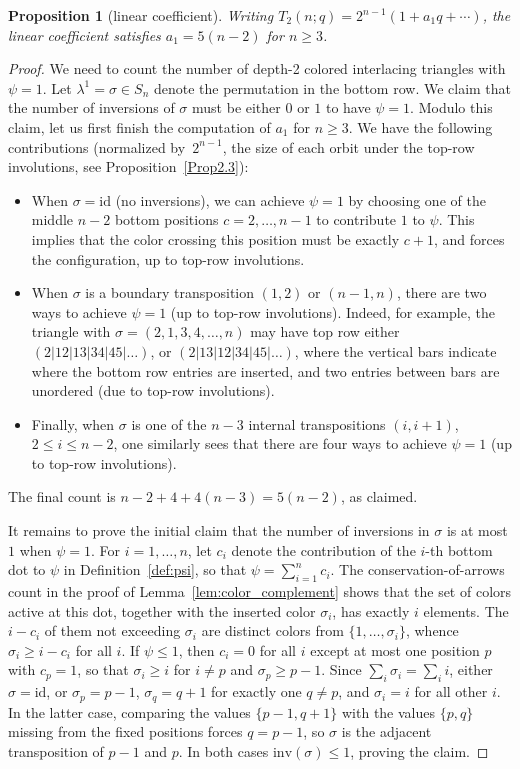 \documentclass[10pt,a4paper]{amsart}
\numberwithin{equation}{section}
\newtheorem{Proposition}[Theorem]{Proposition}
\theoremstyle{definition}
\begin{document}
\begin{Proposition}[linear coefficient]\label{prop:linear_coefficient} Writing
	$T_2(n;q) = 2^{n-1}(1 + a_1 q + \cdots)$, the linear coefficient satisfies
	$a_1 = 5(n-2)$ for $n \ge 3$.
\end{Proposition}
\begin{proof}
	We need to count the number of depth-2 colored interlacing triangles with
	$\psi = 1$.
	Let $\lambda^1=\sigma\in S_n$ denote the permutation in the bottom row.
	We claim that the number of inversions of $\sigma$ must be either $0$ or $1$
	to have $\psi = 1$.
	Modulo this claim, let us first finish the computation of $a_1$ for $n\ge3$.
	We have the following contributions (normalized by~$2^{n-1}$, the size of each orbit under the
top-row involutions, see Proposition~\ref{Prop2.3}):{\samepage
	\begin{itemize}\itemsep=0pt
		\item
		When $\sigma=\mathrm{id}$ (no inversions), we can achieve $\psi=1$ by
		choosing one of the middle $n-2$ bottom positions $c=2,\dots,n-1$ to
		contribute $1$ to $\psi$.
		This implies that the color crossing this position must be exactly
		$c+1$, and forces the configuration, up to top-row involutions.
		\item
		When $\sigma$ is a boundary transposition $(1,2)$ or $(n-1,n)$, there
		are two ways to achieve $\psi=1$ (up to top-row involutions).
		Indeed, for example, the triangle with $\sigma=(2,1,3,4,\dots,n) $ may
		have top row either $(2| 12| 13| 34| 45| \dots) $, or
		$(2| 13| 12| 34| 45| \dots) $, where the vertical bars indicate where
		the bottom row entries are inserted, and two entries between bars are
		unordered (due to top-row involutions).
		\item
		Finally, when $\sigma$ is one of the $n-3$ internal transpositions
		$(i,i+1)$, $2\le i \le n-2$, one similarly sees that there are four ways
		to achieve $\psi=1$ (up to top-row involutions).
	\end{itemize}
	The final count is $n-2+4+4(n-3)=5(n-2)$, as claimed.}

	It remains to prove the initial claim that the number of inversions in
	$\sigma$ is at most $1$ when $\psi=1$.
	For $i=1,\dots,n $, let $c_i$ denote the contribution of the $i$-th
	bottom dot to $\psi$ in Definition~\ref{def:psi}, so that $\psi=\sum_{i=1}^{n}c_i$.
	The conservation-of-arrows count in the proof of
	Lemma~\ref{lem:color_complement} shows that the set of colors active at this
	dot, together with the inserted color $\sigma_i$, has exactly $i$
	elements.
	The $i-c_i$ of them not exceeding $\sigma_i$ are distinct colors from
	$\{1,\dots,\sigma_i\}$, whence $\sigma_i \ge i-c_i$ for all $i$.
	If $\psi\le1$, then $c_i=0$ for all $i$ except at most one position $p$
	with $c_p=1$, so that $\sigma_i\ge i$ for $i\ne p$ and
	$\sigma_p\ge p-1$.
	Since $\sum_{i}\sigma_i=\sum_{i}i$, either $\sigma=\mathrm{id}$, or
	$\sigma_p=p-1$, $\sigma_q=q+1$ for exactly one $q\ne p$, and
	$\sigma_i=i$ for all other $i$.
	In the latter case, comparing the values $\{p-1,q+1\}$ with the values
	$\{p,q\}$ missing from the fixed positions forces $q=p-1$, so $\sigma$
	is the adjacent transposition of $p-1$ and $p$.
	In both cases $\mathrm{inv}(\sigma)\le1$, proving the claim.


\end{proof}
\end{document}
